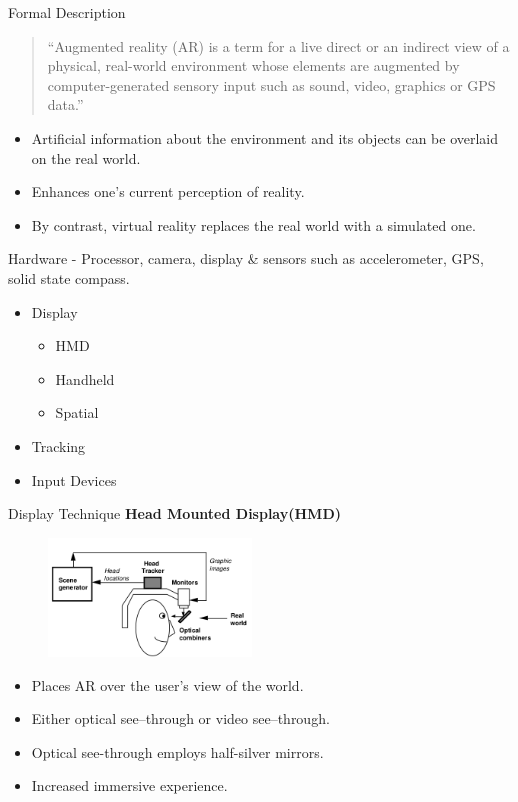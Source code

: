 \documentclass{beamer}
\begin{document}
\begin{frame}{Formal Description}
	\begin{quote}
		“Augmented reality (AR) is a term for a live direct or an indirect view of a physical, real-world environment whose elements are augmented by computer-generated sensory input such as sound, video, graphics or GPS data.”
	\end{quote}
	\begin{itemize}
		\item Artificial information about the environment and its objects can be overlaid on the real world.
		\item Enhances one’s current perception of reality. 
		\item By contrast, virtual reality replaces the real world with a simulated one.
	\end{itemize}
\end{frame}


\begin{frame}{Hardware}
- Processor, camera, display \& sensors such as accelerometer, GPS, solid state compass.\\
	\begin{itemize}
		\item Display
		\begin{itemize}
			\item HMD
			\item Handheld
			\item Spatial
		\end{itemize}
		\item Tracking 
		\item Input Devices
	\end{itemize}
\end{frame}


\begin{frame}{Display Technique}
\textbf{Head Mounted Display(HMD)}
	\begin{figure}
  		\begin{center}
    			\includegraphics[width=0.48\textwidth]{hmd.png}
  		\end{center}
	\end{figure}
	\begin{itemize}
		\item Places AR over the user's view of the world.
		\item Either optical see–through or video see–through.
		\item Optical see-through employs half-silver mirrors.
		\item Increased immersive experience.
	\end{itemize}
\end{frame}
\end{document}
